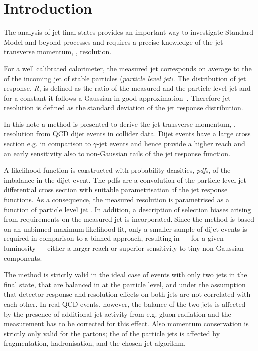 

\section{Introduction}

The analysis of jet final states provides an important way to investigate Standard Model and beyond processes and requires a precise knowledge of the jet transverse momentum, \textit{\pt}, resolution.


For a well calibrated calorimeter, the measured jet \pt corresponds on average to the \pt of the incoming jet of stable particles (\textit{particle level jet}).
The distribution of jet response, \textit{R}, is defined as the ratio of the measured and the particle level jet \pt and for a constant \ptgen it follows a Gaussian in good approximation~\cite{jetography}.
Therefore jet resolution is defined as the standard deviation of the jet response distribution.

In this note a method is presented to derive the jet transverse momentum, \pt, resolution from QCD dijet events in collider data.
Dijet events have a large cross section e.g. in comparison to $\gamma$-jet events and hence provide a higher \pt reach and an early sensitivity also to non-Gaussian tails of the jet response function.

A likelihood function is constructed with probability densities, \textit{pdf}s, of the \pt imbalance in the dijet event.
The pdfs are a convolution of the particle level jet differential cross section with suitable parametrisation of the jet \pt response functions.
As a consequence, the measured resolution is parametrised as a function of particle level jet \pt.
In addition, a description of selection biases arising from requirements on the measured jet \pt is incorporated.
Since the method is based on an unbinned maximum likelihood fit, only a smaller sample of dijet events is required in comparison to a binned approach, resulting in --- for a given luminosity --- either a larger \pt reach or superior sensitivity to tiny non-Gaussian components.

The method is strictly valid in the ideal case of events with only two jets in the final state, that are balanced in \pt at the particle level, and under the assumption that detector response and resolution effects on both jets are not correlated with each other.
In real QCD events, however, the \pt balance of the two jets is affected by the presence of additional jet activity from e.g. gluon radiation and the measurement has to be corrected for this effect.
Also momentum conservation is strictly only valid for the partons; the \pt of the particle jets is affected by fragmentation, hadronisation, and the chosen jet algorithm.

